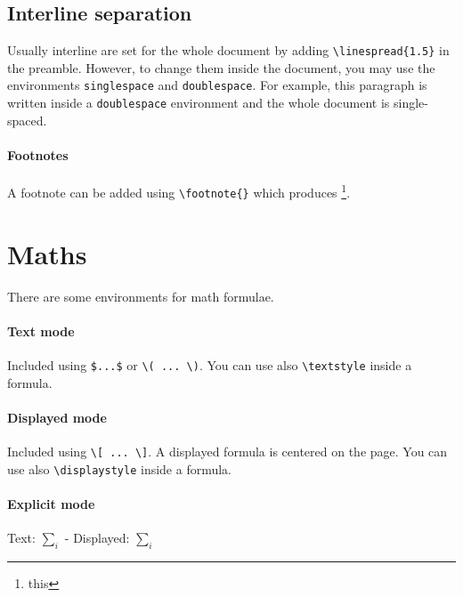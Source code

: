 \subsection{Interline separation}
\begin{doublespace}
Usually interline are set for the whole document by adding
\lstinline$\linespread{1.5}$ in the preamble.
However, to change them inside the document, you may use the environments
\texttt{singlespace} and \texttt{doublespace}.
For example, this paragraph is written inside a \texttt{doublespace} environment
and the whole document is single-spaced.
\end{doublespace}

\paragraph{Footnotes}
A footnote can be added using \lstinline!\footnote{}! which produces%
\footnote{this}.

\section{Maths}

There are some environments for math formulae.

\paragraph{Text mode}
Included using \lstinline!$...$! or \lstinline$\( ... \)$.
You can use also \lstinline$\textstyle$ inside a formula.

\paragraph{Displayed mode}
Included using \lstinline$\[ ... \]$.
A displayed formula is centered on the page.
You can use also \lstinline$\displaystyle$ inside a formula.

\paragraph{Explicit mode}
Text: $\textstyle \sum_i$ - Displayed: $\displaystyle \sum_i$

